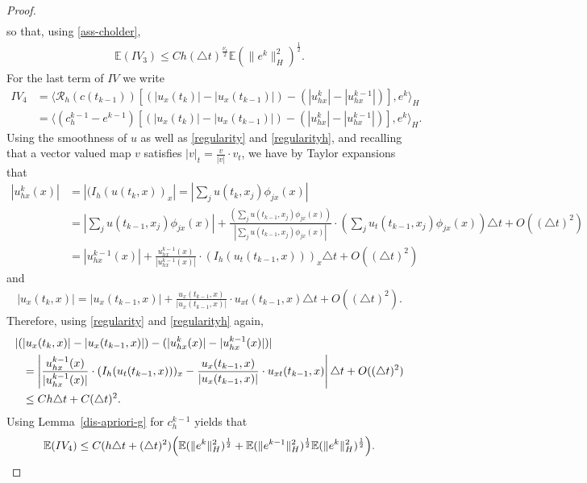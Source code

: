 \documentclass[a4paper,10pt]{article}
\numberwithin{equation}{section}
\begin{document}
\begin{proof}
\begin{align*}
\end{align*}
so that, using \eqref{ass-cholder},
\begin{align*}
\mathbb{E}(IV_{3}) \leq C h (\triangle t)^{\frac{\nu_{r}}{2}} \mathbb{E}(\| e^{k}\|_{H}^{2})^{\frac{1}{2}}.
\end{align*}
For the last term of $IV$ we write
\begin{align*}
IV_{4}& =\langle \mathcal{R}_{h}(c(t_{k-1})) [( |u_{x}(t_{k})| - |u_{x}(t_{k-1})|)-( | u^{k}_{hx}|- | u^{k-1}_{hx}|)], e^{k}\rangle_{H}\\
&=\langle (c_{h}^{k-1}-e^{k-1})[( |u_{x}(t_{k})| - |u_{x}(t_{k-1})|)-( | u^{k}_{hx}|- | u^{k-1}_{hx}|)], e^{k}\rangle_{H}.
\end{align*}
Using the smoothness of $u$ as well as \eqref{regularity} and \eqref{regularityh}, and recalling that
a vector valued map $v$ satisfies $|v|_{t}=\frac{v}{|v|} \cdot v_{t}$, we have by Taylor expansions that
\begin{align*}
|u^{k}_{hx}(x)|&=|(I_{h}(u(t_{k},x))_{x}| = |\sum_{j}u(t_{k}, x_{j})\phi_{jx}(x)|\\
&=|\sum_{j}u(t_{k-1}, x_{j})\phi_{jx}(x)| +\frac{(\sum_{j}u(t_{k-1}, x_{j})\phi_{jx}(x))}{|\sum_{j}u(t_{k-1}, x_{j})\phi_{jx}(x)|}\cdot (\sum_{j}u_{t}(t_{k-1}, x_{j})\phi_{jx}(x)) \triangle t + O((\triangle t)^{2})\\
&=|u^{k-1}_{hx}(x)| + \frac{u^{k-1}_{hx}(x)}{|u^{k-1}_{hx}(x)|} \cdot (I_{h}(u_{t}(t_{k-1},x)))_{x}
\triangle t + O((\triangle t)^{2})
\end{align*}
and
\begin{align*}
|u_{x}(t_{k},x)| = |u_{x}(t_{k-1},x)| + \frac{u_{x}(t_{k-1},x)}{|u_{x}(t_{k-1},x)|}\cdot u_{xt}(t_{k-1},x) \triangle t + O((\triangle t)^{2}).
\end{align*}
Therefore, using
\eqref{regularity} and \eqref{regularityh} again,
\begin{align*}
|(& |u_{x}(t_{k},x)| - |u_{x}(t_{k-1},x)|)-( | u^{k}_{hx}(x)|- | u^{k-1}_{hx}(x)|)| \notag \\
& =\left|\frac{u^{k-1}_{hx}(x)}{|u^{k-1}_{hx}(x)|} \cdot (I_{h}(u_{t}(t_{k-1},x)))_{x} -\frac{u_{x}(t_{k-1},x)}{|u_{x}(t_{k-1},x)|}\cdot u_{xt}(t_{k-1},x) \right| \triangle t +O((\triangle t)^{2}) \notag \\
&\leq C h \triangle t + C(\triangle t)^{2} .
\end{align*}
Using Lemma~\ref{dis-apriori-g} for $c_{h}^{k-1}$ yields that
\begin{align*}
\mathbb{E}(IV_{4}) \leq C(h \triangle t + (\triangle t)^{2}) \Big{(} \mathbb{E}(\| e^{k}\|_{H}^{2})^{\frac{1}{2}} + \mathbb{E}(\| e^{k-1}\|_{H}^{2})^{\frac{1}{2}} \mathbb{E}(\| e^{k}\|_{H}^{2})^{\frac{1}{2}} \Big{)}.

\end{align*}
\end{proof}
\end{document}
